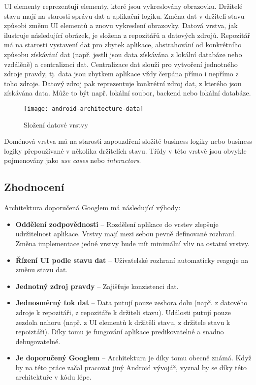 \noindent UI elementy reprezentují elementy, které jsou vykreslovány obrazovku. Držitelé stavu mají na starosti správu dat a aplikační logiku. Změna dat v držiteli stavu způsobi změnu UI elementů a znovu vykreslení obrazovky. Datová vrstva, jak ilustruje následující obrázek, je složena z repozitářů \linebreak  a datových zdrojů. Repozitář má na starosti vystavení dat pro zbytek aplikace, abstrahování od konkrétního způsobu získávání dat (např. jestli jsou data získávána z lokální databáze nebo vzdálěně) a centralizaci dat.  Centralizace dat slouží pro vytvoření jednotného zdroje \linebreak pravdy, tj. data jsou zbytkem aplikace vždy čerpána přímo i nepřímo z toho zdroje. Datový zdroj pak reprezentuje konkrétní zdroj dat, z kterého jsou získávána data. Může to být \linebreak např. lokální soubor, backend nebo lokální databáze. 

\begin{figure}[H]
	\centering
	
	\texttt{[image: android-architecture-data]}
	
	\caption{Složení datové vrstvy \cite{android-architecture}}
	\label{fig:android-architecture-data}
\end{figure}

\noindent Doménová vrstva má na starosti zapouzdření složité business logiky nebo business logiky přepoužívané v několika držitelích stavu. Třídy v této vrstvě jsou obvykle pojmenovány jako \textit{use cases} nebo \textit{interactors}.

\subsection{Zhodnocení}
Architektura doporučená Googlem má následující výhody:

\begin{itemize}
	\item \textbf{Oddělení zodpovědnosti} -- Rozdělení aplikace do vrstev zlepšuje udržitelnost aplikace.  Vrstvy mají mezi sebou pevně definované rozhraní. Změna implementace jedné vrstvy bude mít minimální vliv na ostatní vrstvy.

	\item \textbf{Řízení UI podle stavu dat} -- Uživatelské rozhraní automaticky reaguje na změnu stavu dat. 

	\item \textbf{Jednotný zdroj pravdy} -- Zajišťuje konzistenci dat.

	\item \textbf{Jednosměrný tok dat} -- Data putují pouze zeshora dolu (např. z datového zdroje k repozitáři, z repozitáře k držiteli stavu). Události putují pouze zezdola nahoru (např. z UI elementů k držitěli stavu, z držitele stavu k repoiztáři). Díky tomu je fungování aplikace predikovatelné a snadno debugovatelné.

	\item \textbf{Je doporučený Googlem} -- Architektura je díky tomu obecně známá. Když by na této práce začal pracovat jiný Android vývojář, vyznal by se díky této architektuře v kódu lépe.
\end{itemize}

